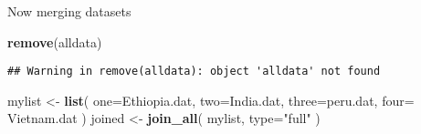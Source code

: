 \documentclass[9pt,]{article}
\newenvironment{Shaded}{\begin{snugshade}}{\end{snugshade}}
\newcommand{\KeywordTok}[1]{\textcolor[rgb]{0.13,0.29,0.53}{\textbf{#1}}}
\newcommand{\DataTypeTok}[1]{\textcolor[rgb]{0.13,0.29,0.53}{#1}}
\newcommand{\StringTok}[1]{\textcolor[rgb]{0.31,0.60,0.02}{#1}}
\newcommand{\NormalTok}[1]{#1}
\begin{document}
Now merging datasets

\begin{Shaded}
\begin{Highlighting}[]
\KeywordTok{remove}\NormalTok{(alldata)}
\end{Highlighting}
\end{Shaded}

\begin{verbatim}
## Warning in remove(alldata): object 'alldata' not found
\end{verbatim}

\begin{Shaded}
\begin{Highlighting}[]
\NormalTok{mylist <-}\StringTok{ }\KeywordTok{list}\NormalTok{( }\DataTypeTok{one=}\NormalTok{Ethiopia.dat, }\DataTypeTok{two=}\NormalTok{India.dat, }\DataTypeTok{three=}\NormalTok{peru.dat, }\DataTypeTok{four=}\NormalTok{ Vietnam.dat )}
\NormalTok{joined <-}\StringTok{ }\KeywordTok{join_all}\NormalTok{( mylist, }\DataTypeTok{type=}\StringTok{"full"}\NormalTok{ ) }
\end{Highlighting}
\end{Shaded}
\end{document}
